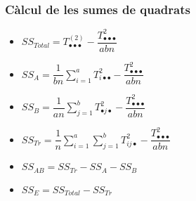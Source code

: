 \documentclass[12pt,t]{beamer}
\theoremstyle{plain}
\theoremstyle{definition}
\begin{document}
\begin{frame}
\frametitle{Càlcul de les sumes de quadrats}
\begin{itemize}

\item $SS_{Total} = T_{\bullet\bullet\bullet}^{(2)}
-\dfrac{T_{\bullet\bullet\bullet}^2}{abn}$
\medskip

\item $SS_A = \displaystyle \dfrac{1}{bn}\sum\limits_{i=1}^a
T_{i\bullet\bullet}^2-\dfrac{T_{\bullet\bullet\bullet}^2}{abn}$
\medskip

\item $SS_B =\displaystyle\dfrac{1}{an}\sum\limits_{j=1}^b T_{\bullet
j\bullet}^2-\dfrac{T_{\bullet\bullet\bullet}^2}{abn}$
\medskip

\item $SS_{Tr}=\displaystyle\dfrac{1}{n}\sum\limits_{i=1}^a\sum\limits_{j=1}^b T_{ij\bullet}^2 -
\dfrac{T_{\bullet\bullet\bullet}^2}{abn}$
\medskip

\item $SS_{AB} = SS_{Tr} -SS_A-SS_B$
\medskip

\item $SS_E = SS_{Total}-SS_{Tr}$
\end{itemize}
\end{frame}
\end{document}
